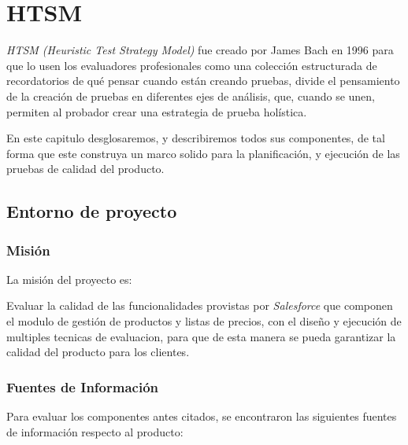 \chapter{HTSM}

\emph{HTSM (Heuristic Test Strategy Model)} fue creado por James Bach en 1996
para que lo usen los evaluadores profesionales como una colección estructurada
de recordatorios de qué pensar cuando están creando pruebas, divide el
pensamiento de la creación de pruebas en diferentes ejes de análisis, que,
cuando se unen, permiten al probador crear una estrategia de prueba
holística\cite{Bach}.

En este capitulo desglosaremos, y describiremos todos sus componentes, de tal
forma que este construya un marco solido para la planificación, y ejecución de
las pruebas de calidad del producto.

\section{Entorno de proyecto}

\subsection{Misión}
La misión del proyecto es:

Evaluar la calidad de las funcionalidades provistas por \emph{Salesforce} que
componen el modulo de gestión de productos y listas de precios, con el diseño y
ejecución de multiples tecnicas de evaluacion, para que de esta manera se pueda
garantizar la calidad del producto para los clientes.

\subsection{Fuentes de Información}
Para evaluar los componentes antes citados, se encontraron las siguientes
fuentes de información respecto al producto:

